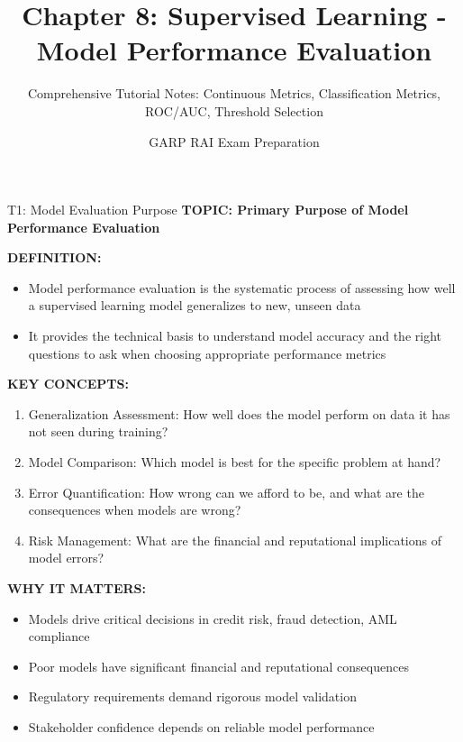 \documentclass[8pt]{beamer}
\title{Chapter 8: Supervised Learning - Model Performance Evaluation}
\subtitle{Comprehensive Tutorial Notes: Continuous Metrics, Classification Metrics, ROC/AUC, Threshold Selection}
\author{GARP RAI Exam Preparation}
\date{}
\begin{document}
	
	\begin{frame}
		\titlepage
	\end{frame}
	
	
	\begin{frame}{T1: Model Evaluation Purpose}
		\fontsize{6.5}{7.5}\selectfont
		\textbf{TOPIC: Primary Purpose of Model Performance Evaluation}
		
		\vspace{0.1cm}
		\textbf{DEFINITION:}
		\begin{itemize}
			\item Model performance evaluation is the systematic process of assessing how well a supervised learning model generalizes to new, unseen data
			\item It provides the technical basis to understand model accuracy and the right questions to ask when choosing appropriate performance metrics
		\end{itemize}
		
		\vspace{0.1cm}
		\textbf{KEY CONCEPTS:}
		\begin{enumerate}
			\item \textcolor{myblue}{Generalization Assessment:} How well does the model perform on data it has not seen during training?
			\item \textcolor{myblue}{Model Comparison:} Which model is best for the specific problem at hand?
			\item \textcolor{myblue}{Error Quantification:} How wrong can we afford to be, and what are the consequences when models are wrong?
			\item \textcolor{myblue}{Risk Management:} What are the financial and reputational implications of model errors?
		\end{enumerate}
		
		\vspace{0.1cm}
		\textbf{WHY IT MATTERS:}
		\begin{itemize}
			\item Models drive critical decisions in credit risk, fraud detection, AML compliance
			\item Poor models have significant financial and reputational consequences
			\item Regulatory requirements demand rigorous model validation
			\item Stakeholder confidence depends on reliable model performance
		\end{itemize}
		

\end{frame}
\end{document}
